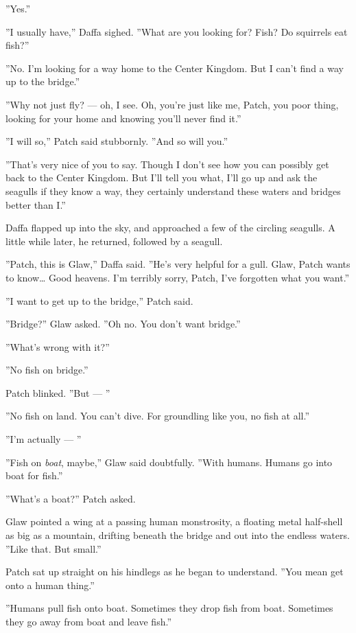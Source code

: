 \documentclass[12pt]{book}
\begin{document}
''Yes.''

''I usually have,'' Daffa sighed. ''What are you looking for? Fish? Do squirrels eat fish?''

''No. I'm looking for a way home to the Center Kingdom. But I can't find a way up to the bridge.''

''Why not just fly? ---
oh, I see. Oh, you're just like me, Patch, you poor thing, looking for your home and knowing you'll never find it.''

''I will so,'' Patch said stubbornly. ''And so will you.''

''That's very nice of you to say. Though I don't see how you can possibly get back to the Center Kingdom. But I'll tell you what, I'll go up and ask the seagulls if they know a way, they certainly understand these waters and bridges better than I.''

Daffa flapped up into the sky, and approached a few of the circling seagulls. A little while later, he returned, followed by a seagull.

''Patch, this is Glaw,'' Daffa said. ''He's very helpful for a gull. Glaw, Patch wants to know\ldots{}
Good heavens. I'm terribly sorry, Patch, I've forgotten what you want.''

''I want to get up to the bridge,'' Patch said.

''Bridge?'' Glaw asked. ''Oh no. You don't want bridge.''

''What's wrong with it?''

''No fish on bridge.''

Patch blinked. ''But ---
''

''No fish on land. You can't dive. For groundling like you, no fish at all.''

''I'm actually ---
''

''Fish on {\it boat}, maybe,'' Glaw said doubtfully. ''With humans. Humans go into boat for fish.''

''What's a boat?'' Patch asked.

Glaw pointed a wing at a passing human monstrosity, a floating metal half-shell as big as a mountain, drifting beneath the bridge and out into the endless waters. ''Like that. But small.''

Patch sat up straight on his hindlegs as he began to understand. ''You mean get onto a human thing.''

''Humans pull fish onto boat. Sometimes they drop fish from boat. Sometimes they go away from boat and leave fish.''
\end{document}
